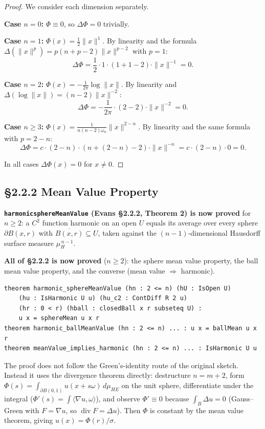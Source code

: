 ﻿\documentclass[12pt, a4paper]{article}
\renewcommand{\_}{\origunderscore\allowbreak}
\theoremstyle{definition}
\theoremstyle{plain}
\begin{document}
\begin{proof}
We consider each dimension separately.

\textbf{Case $n = 0$:} $\Phi \equiv 0$, so $\Delta\Phi = 0$ trivially.

\textbf{Case $n = 1$:} $\Phi(x) = \frac{1}{2}\|x\|^1$.
By linearity and the formula $\Delta(\|x\|^p) = p(n+p-2)\|x\|^{p-2}$ with $p = 1$:
\[ \Delta\Phi = \frac{1}{2} \cdot 1 \cdot (1 + 1 - 2) \cdot \|x\|^{-1} = 0. \]

\textbf{Case $n = 2$:} $\Phi(x) = -\frac{1}{2\pi}\log\|x\|$.
By linearity and $\Delta(\log\|x\|) = (n-2)\|x\|^{-2}$:
\[ \Delta\Phi = -\frac{1}{2\pi} \cdot (2-2) \cdot \|x\|^{-2} = 0. \]

\textbf{Case $n \geq 3$:} $\Phi(x) = \frac{1}{n(n-2)\omega_n}\|x\|^{2-n}$.
By linearity and the same formula with $p = 2-n$:
\[ \Delta\Phi = c \cdot (2-n) \cdot (n + (2-n) - 2) \cdot \|x\|^{-n}
             = c \cdot (2-n) \cdot 0 = 0. \]

In all cases $\Delta\Phi(x) = 0$ for $x \neq 0$.
\end{proof}

\subsection{§2.2.2 Mean Value Property}

\textbf{\texttt{harmonic\_sphereMeanValue} (Evans §2.2.2, Theorem 2) is now proved} for
$n \ge 2$: a $C^2$ function harmonic on an open $U$ equals its average over every sphere
$\partial B(x,r)$ with $\overline{B(x,r)} \subseteq U$, taken against the $(n-1)$-dimensional
Hausdorff surface measure $\mu_H^{\,n-1}$.

\textbf{All of §2.2.2 is now proved} ($n \ge 2$): the sphere mean value property, the ball
mean value property, and the converse (mean value $\Rightarrow$ harmonic).

\begin{lstlisting}[caption={Mean value property (all proved, n >= 2)}]
theorem harmonic_sphereMeanValue (hn : 2 <= n) (hU : IsOpen U)
    (hu : IsHarmonic U u) (hu_c2 : ContDiff R 2 u)
    (hr : 0 < r) (hball : closedBall x r subseteq U) :
    u x = sphereMean u x r
theorem harmonic_ballMeanValue (hn : 2 <= n) ... : u x = ballMean u x r
theorem meanValue_implies_harmonic (hn : 2 <= n) ... : IsHarmonic U u
\end{lstlisting}

The proof does not follow the Green's-identity route of the original sketch. Instead it uses
the divergence theorem directly: destructure $n = m+2$, form $\Phi(s) = \int_{\partial B(0,1)}
u(x + s\omega)\,d\mu_{HE}$ on the unit sphere, differentiate under the integral
($\Phi'(s) = \int \langle \nabla u, \omega\rangle$), and observe $\Phi' \equiv 0$ because
$\int_{B} \Delta u = 0$ (Gauss--Green with $F = \nabla u$, so $\operatorname{div} F = \Delta u$).
Then $\Phi$ is constant by the mean value theorem, giving $u(x) = \Phi(r)/\sigma$.
\end{document}
